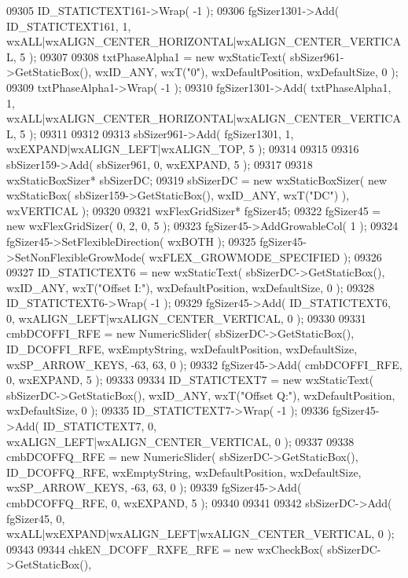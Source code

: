 \begin{DoxyCode}
09305     ID_STATICTEXT161->Wrap( -1 );
09306     fgSizer1301->Add( ID_STATICTEXT161, 1, wxALL|wxALIGN\_CENTER\_HORIZONTAL|wxALIGN\_CENTER\_VERTICAL, 5 );
09307     
09308     txtPhaseAlpha1 = \textcolor{keyword}{new} wxStaticText( sbSizer961->GetStaticBox(), wxID\_ANY, wxT(\textcolor{stringliteral}{"0"}), wxDefaultPosition, 
      wxDefaultSize, 0 );
09309     txtPhaseAlpha1->Wrap( -1 );
09310     fgSizer1301->Add( txtPhaseAlpha1, 1, wxALL|wxALIGN\_CENTER\_HORIZONTAL|wxALIGN\_CENTER\_VERTICAL, 5 );
09311     
09312     
09313     sbSizer961->Add( fgSizer1301, 1, wxEXPAND|wxALIGN\_LEFT|wxALIGN\_TOP, 5 );
09314     
09315     
09316     sbSizer159->Add( sbSizer961, 0, wxEXPAND, 5 );
09317     
09318     wxStaticBoxSizer* sbSizerDC;
09319     sbSizerDC = \textcolor{keyword}{new} wxStaticBoxSizer( \textcolor{keyword}{new} wxStaticBox( sbSizer159->GetStaticBox(), wxID\_ANY, wxT(\textcolor{stringliteral}{"DC"}) ), 
      wxVERTICAL );
09320     
09321     wxFlexGridSizer* fgSizer45;
09322     fgSizer45 = \textcolor{keyword}{new} wxFlexGridSizer( 0, 2, 0, 5 );
09323     fgSizer45->AddGrowableCol( 1 );
09324     fgSizer45->SetFlexibleDirection( wxBOTH );
09325     fgSizer45->SetNonFlexibleGrowMode( wxFLEX\_GROWMODE\_SPECIFIED );
09326     
09327     ID_STATICTEXT6 = \textcolor{keyword}{new} wxStaticText( sbSizerDC->GetStaticBox(), wxID\_ANY, wxT(\textcolor{stringliteral}{"Offset I:"}), 
      wxDefaultPosition, wxDefaultSize, 0 );
09328     ID_STATICTEXT6->Wrap( -1 );
09329     fgSizer45->Add( ID_STATICTEXT6, 0, wxALIGN\_LEFT|wxALIGN\_CENTER\_VERTICAL, 0 );
09330     
09331     cmbDCOFFI_RFE = \textcolor{keyword}{new} NumericSlider( sbSizerDC->GetStaticBox(), ID_DCOFFI_RFE, wxEmptyString, 
      wxDefaultPosition, wxDefaultSize, wxSP\_ARROW\_KEYS, -63, 63, 0 );
09332     fgSizer45->Add( cmbDCOFFI_RFE, 0, wxEXPAND, 5 );
09333     
09334     ID_STATICTEXT7 = \textcolor{keyword}{new} wxStaticText( sbSizerDC->GetStaticBox(), wxID\_ANY, wxT(\textcolor{stringliteral}{"Offset Q:"}), 
      wxDefaultPosition, wxDefaultSize, 0 );
09335     ID_STATICTEXT7->Wrap( -1 );
09336     fgSizer45->Add( ID_STATICTEXT7, 0, wxALIGN\_LEFT|wxALIGN\_CENTER\_VERTICAL, 0 );
09337     
09338     cmbDCOFFQ_RFE = \textcolor{keyword}{new} NumericSlider( sbSizerDC->GetStaticBox(), ID_DCOFFQ_RFE, wxEmptyString, 
      wxDefaultPosition, wxDefaultSize, wxSP\_ARROW\_KEYS, -63, 63, 0 );
09339     fgSizer45->Add( cmbDCOFFQ_RFE, 0, wxEXPAND, 5 );
09340     
09341     
09342     sbSizerDC->Add( fgSizer45, 0, wxALL|wxEXPAND|wxALIGN\_LEFT|wxALIGN\_CENTER\_VERTICAL, 0 );
09343     
09344     chkEN_DCOFF_RXFE_RFE = \textcolor{keyword}{new} wxCheckBox( sbSizerDC->GetStaticBox(), 

\end{DoxyCode}
